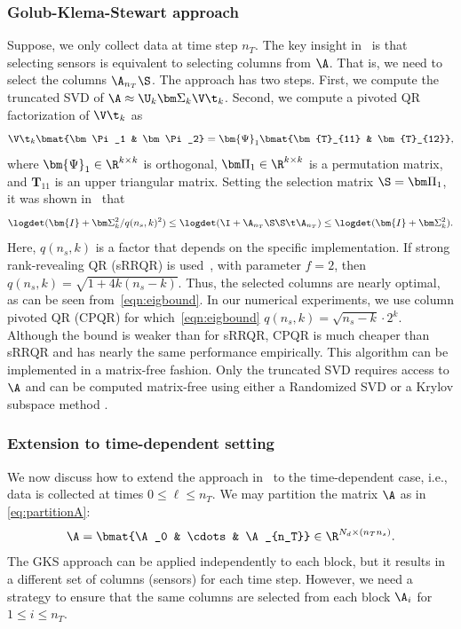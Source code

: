 \documentclass{aims} %
\theoremstyle{definition}
\begin{document}
\subsubsection*{Golub-Klema-Stewart approach} 
Suppose,  we only collect data at time step $n_T$. 
The key insight in~\cite{eswar2024bayesian} is that selecting sensors is equivalent to selecting columns from $\A$. That is, we need to select the columns $\A_{n_T}\S$. The  approach has two steps. First, we compute the truncated SVD of $\A \approx \U_k \bm\Sigma_k \V\t_k$. Second, we compute a pivoted QR factorization of $\V\t_k$ as 
\[\V\t_k \bmat{\bm\Pi_1 & \bm\Pi_2} = \bm{\Psi}_1 \bmat{\bm{T}_{11} & \bm{T}_{12}},\]
where $\bm{\Psi}_1 \in \R^{k \times k}$ is orthogonal, $\bm\Pi_1 \in \R^{k\times k}$ is a permutation matrix, and $\bm{T}_{11}$ is an upper triangular matrix. Setting the selection matrix $\S = \bm\Pi_1$,
it was shown in~\cite{eswar2024bayesian} that
\begin{equation}\label{eqn:eigbound}
    \logdet(\bm{I} + \bm\Sigma_k^2/q(n_s,k)^2)\le  \logdet(\I + \A_{n_T}\S\S\t\A_{n_T})  \le \logdet(\bm{I} + \bm\Sigma_k^2).
\end{equation}   
Here, $q(n_s,k)$ is a factor that depends on the specific implementation. If strong rank-revealing QR (sRRQR) is used~\cite[Algorithm 4]{gu1996efficient}, with parameter $f = 2$, then $q(n_s,k) = \sqrt{1 + 4k(n_s-k)}$. Thus, the selected columns are nearly optimal, as can be seen from~\eqref{eqn:eigbound}.
In our numerical experiments, we  use column pivoted QR (CPQR) for which~\eqref{eqn:eigbound} $q(n_s,k) = \sqrt{n_s-k}\cdot 2^k$. Although the bound is weaker than for sRRQR, CPQR is much cheaper than sRRQR and has nearly the same performance empirically. This algorithm can be implemented in a matrix-free fashion. Only the truncated SVD requires access to $\A$ and can be computed matrix-free using either a Randomized SVD \cite{Halko} or a Krylov subspace method \cite{Matrix_Computations}.




\subsubsection*{Extension to time-dependent setting} We now discuss how to extend the approach  
in~\cite{eswar2024bayesian}
to the time-dependent case, i.e., data is collected at times $0\le \ell \le n_T$. 
We may partition the matrix $\A$ as in \eqref{eq:partitionA}:
\[ \A = \bmat{\A_0 & \cdots & \A_{n_T}}\in \R^{N_d \times (n_Tn_s)}. \]
The GKS approach can be applied independently to each block, but it results in a different set of columns (sensors) for each time step. However, we need a strategy to ensure that the same columns are selected from each block $\A_i$ for $1 \le i \le n_T$. 
\end{document}
